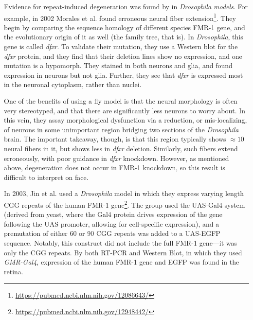 
Evidence for repeat-induced degeneration was found by in \textit{Drosophila models}. For example, in 2002 Morales et al. found erroneous neural fiber extension\footnote{\url{https://pubmed.ncbi.nlm.nih.gov/12086643/}}. They begin by comparing the sequence homology of different species FMR-1 gene, and the evolutionary origin of it as well (the family tree, that is). In \textit{Drosophila}, this gene is called \textit{dfxr}. To validate their mutation, they use a Western blot for the \textit{dfxr} protein, and they find that their deletion lines show no expression, and one mutation is a hypomorph. They stained in both neurons and glia, and found expression in neurons but not glia. Further, they see that \textit{dfxr} is expressed most in the neuronal cytoplasm, rather than nuclei.\newline

One of the benefits of using a fly model is that the neural morphology is often very stereotyped, and that there are significantly less neurons to worry about. In this vein, they assay morphological dysfunction via a reduction, or mis-localizing, of neurons in some unimportant region bridging two sections of the \textit{Drosophila} brain. The important takeaway, though, is that this region typically shows $\approx 10$ neural fibers in it, but shows less in \textit{dfxr} deletion. Similarly, such fibers extend erroneously, with poor guidance in \textit{dfxr} knockdown. However, as mentioned above, degeneration does not occur in FMR-1 knockdown, so this result is difficult to interpret on face.\newline

In 2003, Jin et al. used a \textit{Drosophila} model in which they express varying length CGG repeats of the human FMR-1 gene\footnote{\url{https://pubmed.ncbi.nlm.nih.gov/12948442/}}. The group used the UAS-Gal4 system (derived from yeast, where the Gal4 protein drives expression of the gene following the UAS promoter, allowing for cell-specific expression), and a premutation of either 60 or 90 CGG repeats was added to a UAS-EGFP sequence. Notably, this construct did not include the full FMR-1 gene---it was only the CGG repeats. By both RT-PCR and Western Blot, in which they used \textit{GMR-Gal4}, expression of the human FMR-1 gene and EGFP was found in the retina.\newline

